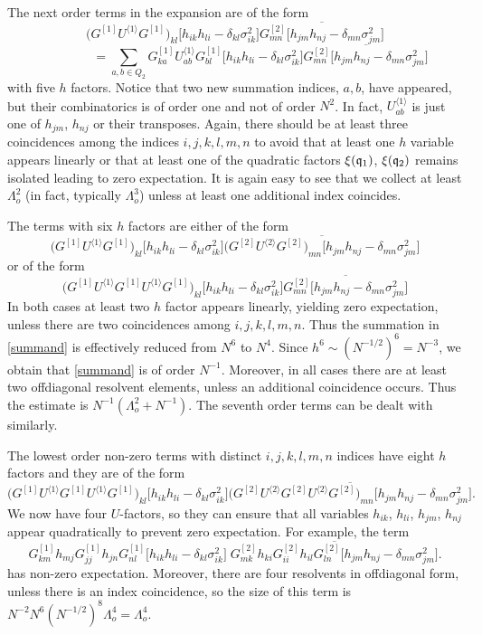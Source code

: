 \documentclass[draft]{article}
\newcommand{\fq}{{\frak q}}
\newcommand{\ov}{\overline}
\numberwithin{equation}{section}
\numberwithin{theorem}{section}
\numberwithin{definition}{section}
\numberwithin{remark}{section}
\begin{document}
The next order terms in the expansion are of the form
 $$
 \Big( G^{[1]} U^{\langle 1\rangle}G^{[1]}\Big)_{kl} \big[ h_{ik}h_{li} - \delta_{kl}\sigma_{ik}^2\big]
 \ov{ G_{mn}^{[2]} \big[ h_{jm}h_{nj} - \delta_{mn}\sigma_{jm}^2\big]}
$$
$$
\qquad\qquad = \sum_{a,b\in Q_2} G^{[1]}_{ka} U^{\langle 1\rangle}_{ab}G^{[1]}_{bl} 
\big[ h_{ik}h_{li} - \delta_{kl}\sigma_{ik}^2\big]
\ov{  G_{mn}^{[2]} \big[ h_{jm}h_{nj} - \delta_{mn}\sigma_{jm}^2\big]}
$$
with five $h$ factors. Notice that two new summation indices, $a, b$,
have appeared, but their combinatorics is of order one and not of order $N^2$.
In fact, $ U^{\langle 1\rangle}_{ab}$ is just one of $h_{jm}$, $h_{nj}$ 
or their transposes.
Again, there should be
at least three coincidences  among the indices $i,j,k,l,m,n$
 to avoid that at least one $h$ variable appears linearly
or that at least one of the quadratic factors $\xi(\fq_1)$,
$\xi(\fq_2)$ remains isolated
leading to zero expectation.
It is again easy to see that we collect at least $\Lambda_o^2$
(in fact, typically $\Lambda_o^3$) unless at least one additional index coincides.


The terms with six $h$ factors are either of the form
 $$
 \Big( G^{[1]} U^{\langle 1\rangle}G^{[1]}\Big)_{kl} \big[ h_{ik}h_{li} - \delta_{kl}\sigma_{ik}^2\big]
 \ov{\Big(
 G^{[2]}U^{\langle 2\rangle}G^{[2]}\Big)_{mn}  \big[ h_{jm}h_{nj} - \delta_{mn}\sigma_{jm}^2\big]}
$$
or of the form
$$
 \Big( G^{[1]} U^{\langle 1\rangle}G^{[1]} U^{\langle 1\rangle}G^{[1]} \Big)_{kl} 
\big[ h_{ik}h_{li} - \delta_{kl}\sigma_{ik}^2\big]
 \ov{ G_{mn}^{[2]} \big[ h_{jm}h_{nj} - \delta_{mn}\sigma_{jm}^2\big]}
$$
In both cases at least two $h$ factor appears linearly, yielding
zero expectation, unless there are two coincidences
 among $i,j,k,l,m,n$. Thus the summation in \eqref{summand}
is effectively reduced from  $N^6$ to $N^4$.
 Since $h^6\sim (N^{-1/2})^6=N^{-3}$, we obtain that \eqref{summand} is
of order $N^{-1}$.
Moreover, in all cases there are at least two offdiagonal resolvent elements,
unless an additional coincidence occurs. Thus the  estimate is $N^{-1}(\Lambda^2_o+N^{-1})$.
The seventh order terms can be dealt with similarly.

 The
lowest order non-zero terms with distinct $i,j,k,l,m,n$ 
indices have eight $h$ factors and they are of the form 
$$
 \Big( G^{[1]} U^{\langle 1\rangle}G^{[1]} U^{\langle 1\rangle}G^{[1]} \Big)_{kl} 
\big[ h_{ik}h_{li} - \delta_{kl}\sigma_{ik}^2\big]
 \ov{ \Big( G^{[2]} U^{\langle 2\rangle}G^{[2]}U^{\langle 2\rangle}G^{[2]}
\Big)_{mn} \big[ h_{jm}h_{nj} - \delta_{mn}\sigma_{jm}^2\big]}.
$$
We now have four $U$-factors, so they can 
ensure that all variables  $h_{ik}$, $h_{li}$, $h_{jm}$, $h_{nj}$
appear quadratically
to prevent zero expectation. For example, the term
$$
 G^{[1]}_{km}h_{mj}G^{[1]}_{jj} h_{jn}G^{[1]}_{nl}
\big[ h_{ik}h_{li} - \delta_{kl}\sigma_{ik}^2\big]
 \;\ov{  G^{[2]}_{mk}h_{ki} G^{[2]}_{ii} h_{il}G^{[2]}_{ln}
 \big[ h_{jm}h_{nj} - \delta_{mn}\sigma_{jm}^2\big]}.
$$
has non-zero expectation. Moreover, there are  four resolvents
in offdiagonal form, unless
there is an index coincidence, so the size of this term
is  $N^{-2} N^{6} (N^{-1/2})^8 \Lambda_o^4=\Lambda_o^4$.
\end{document}

